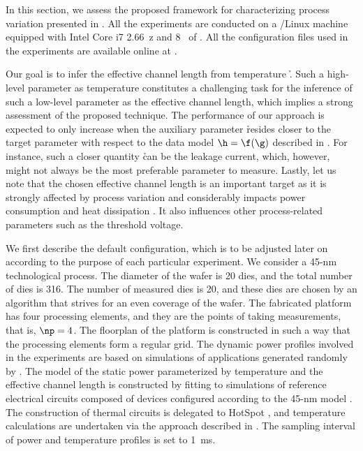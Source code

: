 In this section, we assess the proposed framework for characterizing process
variation presented in . All the experiments are conducted
on a /Linux machine equipped with Intel Core i7 2.66~z and
8~ of . All the configuration files used in the experiments are
available online at \cite{eslab2014a}.

Our goal is to infer the effective channel length \g from temperature \h. Such a
high-level parameter as temperature constitutes a challenging task for the
inference of such a low-level parameter as the effective channel length, which
implies a strong assessment of the proposed technique. The performance of our
approach is expected to only increase when the auxiliary parameter \h resides
closer to the target parameter \g with respect to the data model $\h = \f(\g)$
described in . For instance, such a closer quantity \h
can be the leakage current, which, however, might not always be the most
preferable parameter to measure. Lastly, let us note that the chosen effective
channel length is an important target as it is strongly affected by process
variation and considerably impacts power consumption and heat dissipation
\cite{chandrakasan2000, srivastava2010, juan2011, juan2012}. It also influences
other process-related parameters such as the threshold voltage.

We first describe the default configuration, which is to be adjusted later on
according to the purpose of each particular experiment. We consider a 45-nm
technological process. The diameter of the wafer is 20 dies, and the total
number of dies \nd is 316. The number of measured dies \hnd is 20, and these
dies are chosen by an algorithm that strives for an even coverage of the wafer.
The fabricated platform has four processing elements, and they are the points of
taking measurements, that is, $\np = 4$. The floorplan of the platform is
constructed in such a way that the processing elements form a regular grid. The
dynamic power profiles involved in the experiments are based on simulations of
applications generated randomly by  \cite{dick1998}. The model of the
static power parameterized by temperature and the effective channel length is
constructed by fitting to  simulations of reference electrical
circuits composed of  devices \cite{bsim} configured according to the
45-nm   model \cite{ptm}. The construction of thermal 
circuits is delegated to HotSpot \cite{skadron2003}, and temperature
calculations are undertaken via the approach described in
. The sampling interval of power and temperature
profiles is set to 1~ms.

